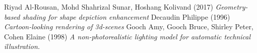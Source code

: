 \begin{thebibliography}{9}
	Riyad Al-Rousan, Mohd Shahrizal Sunar, Hoshang Kolivand (2017) \emph{Geometry-based shading for shape depiction enhancement}
	Decaudin Philippe (1996) \emph{Cartoon-looking rendering of 3d-scenes}
	Gooch Amy, Gooch Bruce, Shirley Peter, Cohen Elaine (1998) \emph{A non-photorealistic lighting model for automatic technical illustration.}
\end{thebibliography}